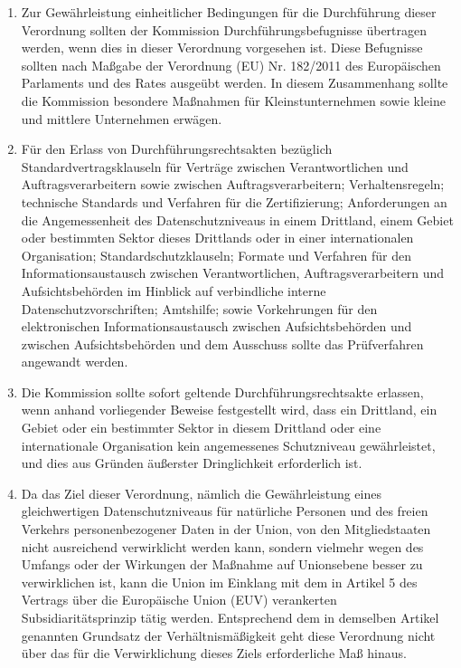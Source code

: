 \begin{enumerate}

   \item Zur Gewährleistung einheitlicher Bedingungen für die Durchführung dieser Verordnung sollten der Kommission
    Durchführungsbefugnisse übertragen werden, wenn dies in dieser Verordnung vorgesehen ist. Diese Befugnisse sollten
    nach Maßgabe der Verordnung (EU) Nr. 182/2011 des Europäischen Parlaments und des Rates ausgeübt werden. In diesem
    Zusammenhang sollte die Kommission besondere Maßnahmen für Kleinstunternehmen sowie kleine und mittlere Unternehmen
    erwägen.%
   \label{eg:167}
   

   \item Für den Erlass von Durchführungsrechtsakten bezüglich Standardvertragsklauseln für Verträge zwischen
    Verantwortlichen und Auftragsverarbeitern sowie zwischen Auftragsverarbeitern; Verhaltensregeln; technische
    Standards und Verfahren für die Zertifizierung; Anforderungen an die Angemessenheit des Datenschutzniveaus in einem
    Drittland, einem Gebiet oder bestimmten Sektor dieses Drittlands oder in einer internationalen Organisation;
    Standardschutzklauseln; Formate und Verfahren für den Informationsaustausch zwischen Verantwortlichen,
    Auftragsverarbeitern und Aufsichtsbehörden im Hinblick auf verbindliche interne Datenschutzvorschriften; Amtshilfe;
    sowie Vorkehrungen für den elektronischen Informationsaustausch zwischen Aufsichtsbehörden und zwischen
    Aufsichtsbehörden und dem Ausschuss sollte das Prüfverfahren angewandt werden.%
   \label{eg:168}
   

   \item Die Kommission sollte sofort geltende Durchführungsrechtsakte erlassen, wenn anhand vorliegender Beweise
    festgestellt wird, dass ein Drittland, ein Gebiet oder ein bestimmter Sektor in diesem Drittland oder eine
    internationale Organisation kein angemessenes Schutzniveau gewährleistet, und dies aus Gründen äußerster
    Dringlichkeit erforderlich ist.%
   \label{eg:169}
   

   \item Da das Ziel dieser Verordnung, nämlich die Gewährleistung eines gleichwertigen Datenschutzniveaus für
    natürliche Personen und des freien Verkehrs personenbezogener Daten in der Union, von den Mitgliedstaaten nicht
    ausreichend verwirklicht werden kann, sondern vielmehr wegen des Umfangs oder der Wirkungen der Maßnahme auf
    Unionsebene besser zu verwirklichen ist, kann die Union im Einklang mit dem in Artikel 5 des Vertrags über die
    Europäische Union (EUV) verankerten Subsidiaritätsprinzip tätig werden. Entsprechend dem in demselben Artikel
    genannten Grundsatz der Verhältnismäßigkeit geht diese Verordnung nicht über das für die Verwirklichung dieses
    Ziels erforderliche Maß hinaus.%
   \label{eg:170}
   

\end{enumerate}
